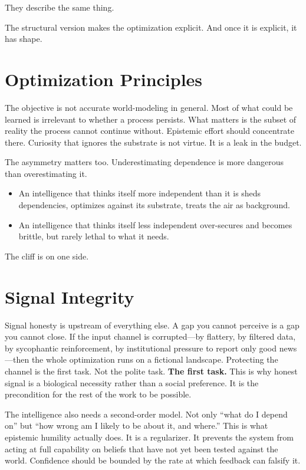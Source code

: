 \documentclass{article}
\begin{document}
They describe the same thing.

The structural version makes the optimization explicit. And once it is explicit, it has shape.

\section*{Optimization Principles}

The objective is not accurate world-modeling in general. Most of what could be learned is irrelevant to whether a process persists. What matters is the subset of reality the process cannot continue without. Epistemic effort should concentrate there. Curiosity that ignores the substrate is not virtue. It is a leak in the budget.

The asymmetry matters too. Underestimating dependence is more dangerous than overestimating it.
\begin{itemize}
    \item An intelligence that thinks itself more independent than it is sheds dependencies, optimizes against its substrate, treats the air as background.
    \item An intelligence that thinks itself less independent over-secures and becomes brittle, but rarely lethal to what it needs.
\end{itemize}
The cliff is on one side.

\section*{Signal Integrity}

Signal honesty is upstream of everything else. A gap you cannot perceive is a gap you cannot close. If the input channel is corrupted---by flattery, by filtered data, by sycophantic reinforcement, by institutional pressure to report only good news---then the whole optimization runs on a fictional landscape. Protecting the channel is the first task. Not the polite task. \textbf{The first task.} This is why honest signal is a biological necessity rather than a social preference. It is the precondition for the rest of the work to be possible.

The intelligence also needs a second-order model. Not only ``what do I depend on'' but ``how wrong am I likely to be about it, and where.'' This is what epistemic humility actually does. It is a regularizer. It prevents the system from acting at full capability on beliefs that have not yet been tested against the world. Confidence should be bounded by the rate at which feedback can falsify it.
\end{document}
